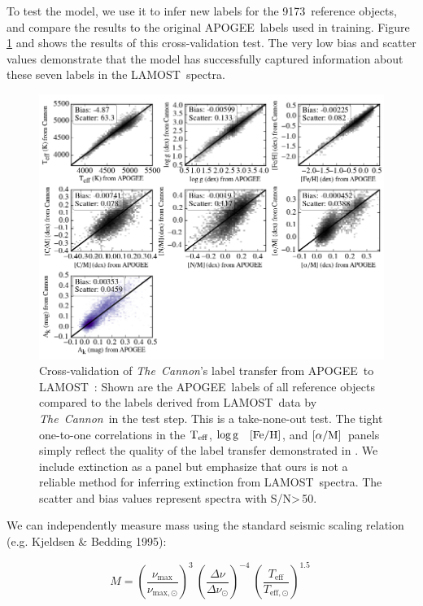 \documentclass[12pt, preprint]{aastex}
\newcommand{\tc}{\textsl{The~Cannon}}
\newcommand{\apogee}{APOGEE}
\newcommand{\lamost}{LAMOST}
\newcommand{\teff}{\mbox{$\rm T_{eff}$}}
\newcommand{\logg}{\mbox{$\rm \log g$}}
\newcommand{\feh}{\mbox{$\rm [Fe/H]$}}
\newcommand{\alpham}{\mbox{$\rm [\alpha/M]$}}
\newcommand{\ntrobj}{9173}
\newcommand{\snr}{S/N}
\begin{document}
To test the model, we use it to infer new labels for the
\ntrobj\ reference objects, and compare the results 
to the original \apogee\ labels used in training.
Figure \ref{fig:cross-validation} and 
shows the results of
this cross-validation test. The very low bias
and scatter values demonstrate 
that the model has successfully
captured information about these seven labels in the
\lamost\ spectra.

\begin{figure}[!hp]
\centering
\includegraphics[scale=0.75]{xval.png}
\caption{Cross-validation of \tc 's label transfer from \apogee\ to \lamost~: Shown are the \apogee\ labels of all reference objects compared to the labels derived from \lamost\ data by \tc\ in the test step. This is a take-none-out test. The tight one-to-one correlations in the \teff , \logg~ \feh, and \alpham\ panels simply reflect the quality of the label transfer demonstrated in \citet{Ho2016}.
We include extinction as a panel
but emphasize that ours is not a reliable method for 
inferring extinction from \lamost\ spectra.
The scatter and bias values represent spectra with \snr\textgreater\,50.
}
\label{fig:cross-validation}
\end{figure}

We can independently measure mass using the standard seismic scaling relation (e.g. Kjeldsen \& Bedding 1995):

\begin{equation} \label{eq:mass}
M= \left( \frac{\nu_{\mathrm{max}}}{\nu_{\mathrm{max,\odot}}}\right)^3\  \left( \frac{\Delta \nu}{\Delta \nu_{\odot}}\right)^{-4} \ \left( \frac{T_{\mathrm{eff}}}{T_{\mathrm{eff,\odot}}}\right)^{1.5} \ 
\end{equation}
\end{document}
